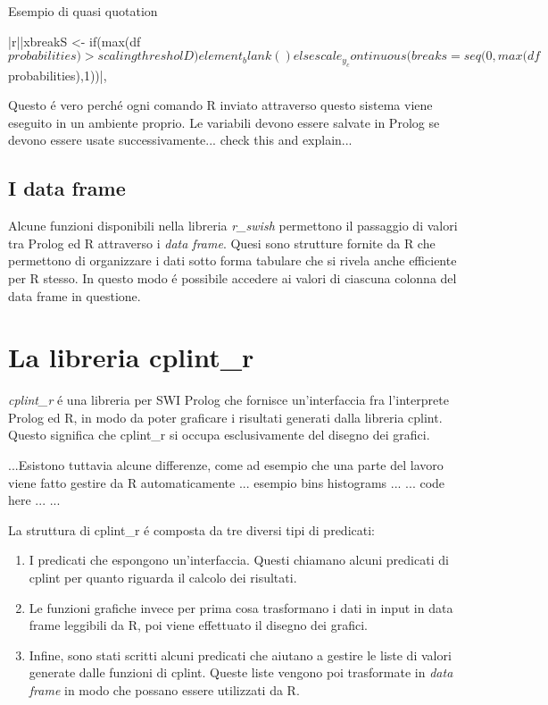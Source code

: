 \documentclass[10pt,titlepage,twoside,a4paper]{report}
\newenvironment{code}{\singlespacing\captionsetup{type=listing}}{}
\begin{document}
\begin{code}
    \caption{Esempio di quasi quotation}
    \begin{rcode*}{}
{|r||xbreakS <- if(max(df$probabilities) > scalingthresholD) element_blank() else scale_y_continuous(breaks=seq(0,max(df$probabilities),1))|},
    \end{rcode*}
\end{code}

Questo \'e vero perch\'e ogni comando R inviato attraverso questo sistema viene 
eseguito in un ambiente proprio. Le variabili devono 
essere salvate in Prolog se devono essere usate successivamente... check 
this and explain...

\section{I data frame}
Alcune funzioni disponibili nella libreria \emph{r\_swish} permettono il 
passaggio di valori tra Prolog ed R attraverso i \emph{data frame}. Quesi sono 
strutture fornite da R che permettono di organizzare i dati sotto forma 
tabulare che si rivela anche efficiente per R stesso. In questo modo \'e 
possibile accedere ai valori di ciascuna colonna del data frame in questione.




\chapter{La libreria cplint\_r} \label{la-libreria-cplint-r}
\emph{cplint\_r} \'e una libreria per SWI Prolog che fornisce un'interfaccia 
fra l'interprete Prolog ed R, in modo da poter graficare i risultati generati 
dalla libreria cplint. Questo significa che cplint\_r si occupa esclusivamente 
del disegno dei grafici.

...Esistono tuttavia alcune differenze, come ad esempio che una 
parte del lavoro viene fatto gestire da R automaticamente ... esempio bins 
histograms ... ... code here ...
...

La struttura di cplint\_r \'e composta da tre diversi tipi di predicati:
\begin{enumerate}
    \item I predicati che espongono un'interfaccia. Questi chiamano alcuni 
          predicati di cplint per quanto riguarda il calcolo dei risultati.
    \item Le funzioni grafiche invece per prima cosa trasformano i dati in 
          input in data frame leggibili da R, poi viene effettuato il disegno 
          dei grafici.
    \item Infine, sono stati scritti alcuni predicati che aiutano a gestire le 
          liste di valori generate dalle funzioni di cplint. Queste liste 
          vengono poi trasformate in \emph{data frame} in modo che possano 
          essere utilizzati da R.
\end{enumerate}
\end{document}
